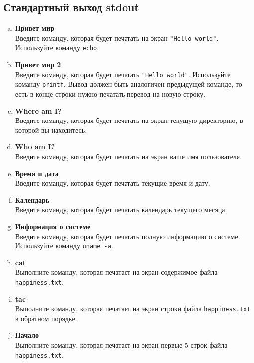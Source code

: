 \documentclass{article}
\begin{document}
\subsection{Стандартный выход stdout}
\begin{enumerate}[a.]
\item \textbf{Привет мир}\\
Введите команду, которая будет печатать на экран \texttt{"Hello world"}. Используйте команду \texttt{echo}.

\item \textbf{Привет мир 2}\\
Введите команду, которая будет печатать \texttt{"Hello world"}. Используйте команду \texttt{printf}. Вывод должен быть аналогичен предыдущей команде, то есть в конце строки нужно печатать перевод на новую строку.

\item \textbf{Where am I?}\\
Введите команду, которая будет печатать на экран текущую директорию, в которой вы находитесь.

\item \textbf{Who am I?}\\
Введите команду, которая будет печатать на экран ваше имя пользователя.

\item \textbf{Время и дата}\\
Введите команду, которая будет печатать текущие время и дату.

\item \textbf{Календарь}\\
Введите команду, которая будет печатать календарь текущего месяца.

\item \textbf{Информация о системе}\\
Введите команду, которая будет печатать полную информацию о системе. Используйте команду \texttt{uname -a}.

\item \textbf{cat}\\
Выполните команду, которая печатает на экран содержимое файла \texttt{happiness.txt}.

\item \textbf{tac}\\
Выполните команду, которая печатает на экран строки файла \texttt{happiness.txt} в обратном порядке.

\item \textbf{Начало}\\
Выполните команду, которая печатает на экран первые 5 строк файла \texttt{happiness.txt}.


\end{enumerate}
\end{document}
